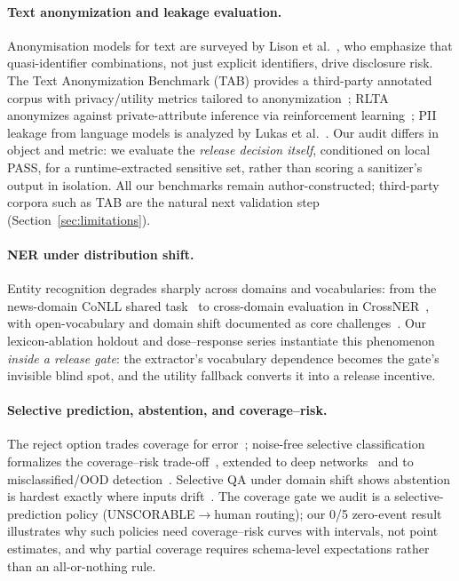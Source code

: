 \documentclass[journal]{IEEEtran}
\begin{document}
\paragraph{Text anonymization and leakage evaluation.} Anonymisation models for text are surveyed by Lison et al.~\cite{lison2021anonymisation}, who emphasize that quasi-identifier combinations, not just explicit identifiers, drive disclosure risk. The Text Anonymization Benchmark (TAB) provides a third-party annotated corpus with privacy/utility metrics tailored to anonymization~\cite{pilan2022tab}; RLTA anonymizes against private-attribute inference via reinforcement learning~\cite{mosallanezhad2019rlta}; PII leakage from language models is analyzed by Lukas et al.~\cite{lukas2023pii}. Our audit differs in object and metric: we evaluate the \emph{release decision itself}, conditioned on local PASS, for a runtime-extracted sensitive set, rather than scoring a sanitizer's output in isolation. All our benchmarks remain author-constructed; third-party corpora such as TAB are the natural next validation step (Section~\ref{sec:limitations}).

\paragraph{NER under distribution shift.} Entity recognition degrades sharply across domains and vocabularies: from the news-domain CoNLL shared task~\cite{tjong2003conll} to cross-domain evaluation in CrossNER~\cite{liu2021crossner}, with open-vocabulary and domain shift documented as core challenges~\cite{fu2018survey}. Our lexicon-ablation holdout and dose--response series instantiate this phenomenon \emph{inside a release gate}: the extractor's vocabulary dependence becomes the gate's invisible blind spot, and the utility fallback converts it into a release incentive.

\paragraph{Selective prediction, abstention, and coverage--risk.} The reject option trades coverage for error~\cite{chow1970reject}; noise-free selective classification formalizes the coverage--risk trade-off~\cite{elyaniv2010selective}, extended to deep networks~\cite{geifman2017selective} and to misclassified/OOD detection~\cite{hendrycks2017baseline}. Selective QA under domain shift shows abstention is hardest exactly where inputs drift~\cite{kamath2020selective}. The coverage gate we audit is a selective-prediction policy (UNSCORABLE$\to$human routing); our 0/5 zero-event result illustrates why such policies need coverage--risk curves with intervals, not point estimates, and why partial coverage requires schema-level expectations rather than an all-or-nothing rule.
\end{document}
